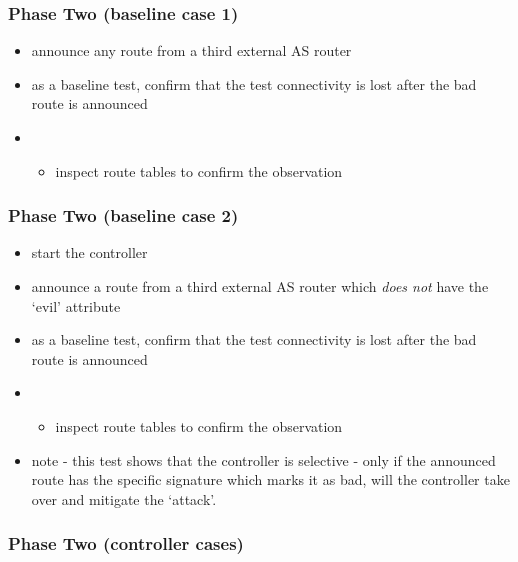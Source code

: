 \subsubsection{Phase Two (baseline case 1)}
\begin{itemize}
    \item announce any route from a third external AS router
    \item as a baseline test, confirm that the test connectivity is lost after the bad route is announced
    \item \begin{itemize}
        \item inspect route tables to confirm the observation
    \end{itemize}
\end{itemize}


\subsubsection{Phase Two (baseline case 2)}

\begin{itemize}
    \item start the \hbgp controller
    \item announce a route from a third external AS router which \textit{does not} have the `evil' attribute
    \item as a baseline test, confirm that the test connectivity is lost after the bad route is announced
    \item \begin{itemize}
        \item inspect route tables to confirm the observation
    \end{itemize}
    \item note - this test shows that the controller is selective - only if the announced route has the specific signature which marks it as bad, will the controller take over and mitigate the `attack'.
\end{itemize}

\subsubsection{Phase Two (controller cases)}


